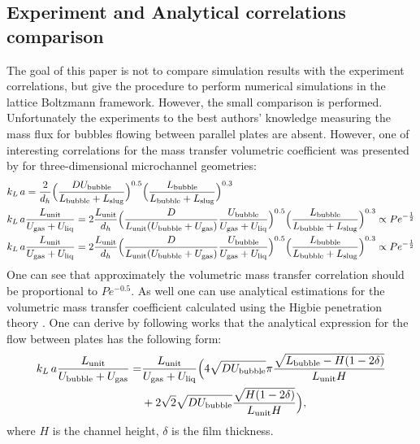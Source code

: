 \documentclass{article}
\newcommand{\beq}{\begin{equation}}
\newcommand{\feq}{\end{equation}}
\newcommand{\beqal}{\begin{equation}\begin{aligned}}
\newcommand{\feqal}{\end{aligned}\end{equation}}
\newcommand{\vol}{k_L\,a}
\newcommand{\lbubble}{L_{\mathrm{bubble}}}
\newcommand{\lunit}{L_{\mathrm{unit}}}
\newcommand{\lslug}{L_{\mathrm{slug}}}
\newcommand{\ububble}{U_{\mathrm{bubble}}}
\newcommand{\uliq}{U_{\mathrm{liq}}}
\newcommand{\ugas}{U_{\mathrm{gas}}}
\newcommand{\volnondim}{\vol \frac{\lunit}{\ububble+\ugas}}
\begin{document}
\subsection{Experiment and Analytical correlations comparison}
The goal of this paper is not to compare simulation results with the experiment correlations, but give the
procedure to perform numerical simulations  in the lattice Boltzmann framework. However, the
small comparison is performed.
Unfortunately the experiments to the best authors' knowledge measuring the mass flux for  bubbles flowing between parallel plates are absent. However, one of interesting
correlations for the mass transfer volumetric coefficient was presented by
\citet{yue-mass} for three-dimensional microchannel geometries:
\beqal
&\vol=\frac{2}{d_h}\Bigl(\frac{D \ububble}{\lbubble+\lslug}\Bigr)^{0.5}
\Bigl(\frac{\lbubble}{\lbubble+\lslug}\Bigr)^{0.3}\\
&\vol \frac{\lunit}{\ugas+\uliq}=2\frac{\lunit}{d_h} \Bigl(\frac{D 
}{\lunit (\ububble+\ugas)} \frac{\ububble}{\ugas+\uliq}\Bigr)^{0.5}
\Bigl(\frac{\lbubble}{\lbubble+\lslug}\Bigr)^{0.3} \propto Pe^{-\frac{1}{2}}\\
&\vol \frac{\lunit}{\ugas+\uliq}=2\frac{\lunit}{d_h} \Bigl(\frac{D 
}{\lunit (\ububble+\ugas)} \frac{\ububble}{\ugas+\uliq}\Bigr)^{0.5}
\Bigl(\frac{\lbubble}{\lbubble+\lslug}\Bigr)^{0.3} \propto Pe^{-\frac{1}{2}}
\feqal
One can see that approximately the volumetric mass transfer correlation should be proportional to
$Pe^{-0.5}$. As well one can use analytical estimations for the volumetric mass transfer
coefficient calculated using the Higbie penetration theory \cite{higbie}. One can derive by following works
\cite{irandoust,vanbaten-circular} that the analytical expression for the flow between plates has
the following form:
\beq
\label{vanbaten:analytical:expresssion}
\begin{aligned}
\volnondim=&\frac{\lunit}{\ugas+\uliq}\Bigl(4 \sqrt{D \ububble}{\pi}
\frac{\sqrt{\lbubble-H (1-2\delta)}}{\lunit H}\\
&+2 \sqrt{2} \sqrt{D \ububble} \frac{\sqrt{H
(1-2\delta)}}{\lunit H}\Bigr),
\end{aligned}
\feq
where $H$ is the channel height, $\delta$ is the film thickness.
\end{document}
